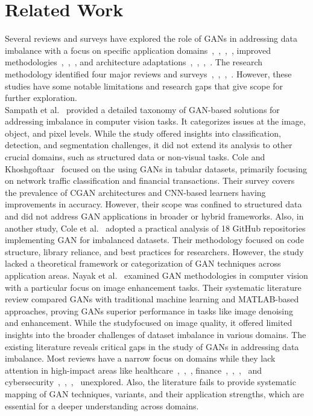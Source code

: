 \section{Related Work}
Several reviews and surveys have explored the role of GANs in addressing data imbalance with a focus on specific application domains~\cite{52},~\cite{53},~\cite{54},~\cite{55}, improved methodologies~\cite{56},~\cite{57},~\cite{58}, and architecture adaptations~\cite{59},~\cite{60},~\cite{61},~\cite{62}. The research methodology identified four major reviews and surveys~\cite{63},~\cite{64},~\cite{65},~\cite{66}. However, these studies have some notable limitations and research gaps that give scope for further exploration.\\
Sampath et al.~\cite{63} provided a detailed taxonomy of GAN-based solutions for addressing imbalance in computer vision tasks. It categorizes issues at the image, object, and pixel levels. While the study offered insights into classification, detection, and segmentation challenges, it did not extend its analysis to other crucial domains, such as structured data or non-visual tasks. 
Cole and Khoshgoftaar~\cite{64} focused on the using GANs in tabular datasets, primarily focusing on network traffic classification and financial transactions. Their survey covers the prevalence of CGAN architectures and CNN-based learners having improvements in accuracy. However, their scope was confined to structured data and did not address GAN applications in broader or hybrid frameworks. 
Also, in another study, Cole et al.~\cite{65} adopted a practical analysis of 18 GitHub repositories implementing GAN for imbalanced datasets. Their methodology focused on code structure, library reliance, and best practices for researchers. However, the study lacked a theoretical framework or categorization of GAN techniques across application areas.   
Nayak et al.~\cite{66} examined GAN methodologies in computer vision with a particular focus on image enhancement tasks. Their systematic literature review compared GANs with traditional machine learning and MATLAB-based approaches, proving GANs superior performance in tasks like image denoising and enhancement. While the studyfocused on image quality, it offered limited insights into the broader challenges of dataset imbalance in various domains.
The existing literature reveals critical gaps in the study of GANs in addressing data imbalance. Most reviews have a narrow focus on domains while they lack attention in high-impact areas like healthcare~\cite{67},~\cite{68},~\cite{69}, finance~\cite{70},~\cite{71},~\cite{72},~\cite{73} and cybersecurity~\cite{74},~\cite{75},~\cite{76},~\cite{77} unexplored. Also, the literature fails to provide systematic mapping of GAN techniques, variants, and their application strengths, which are essential for a deeper understanding across domains.

